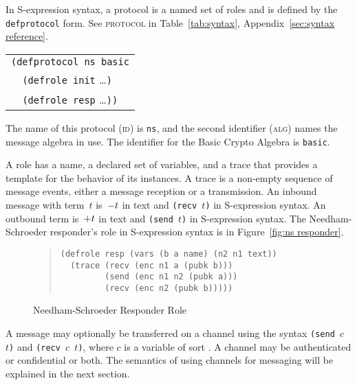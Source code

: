 \documentclass[12pt]{article}
\begin{document}
In S-expression syntax, a protocol is a named set of roles and is
defined by the \texttt{defprotocol} form.  See \textsc{protocol} in
Table~\ref{tab:syntax}, Appendix~\ref{sec:syntax reference}.
\begin{center}
\begin{tabular}{l}
\verb|(defprotocol ns basic|\\
\verb|  (defrole init| \ldots\texttt{)}\\
\verb|  (defrole resp| \ldots\texttt{))}
\end{tabular}
\end{center}

The name of this protocol (\textsc{id}) is \texttt{ns}, and the second
identifier (\textsc{alg}) names the message algebra in use.  The
identifier for the Basic Crypto Algebra is \texttt{basic}.

A role has a name, a declared set of variables, and a trace that
provides a template for the behavior of its instances.  A trace is a
non-empty sequence of message events, either a message reception or a
transmission.  An inbound message with term~$t$
is~$\mathord - t$ in text and \texttt{(recv $t$)} in S-expression syntax.
An outbound term is~$\mathord + t$ in text and
\texttt{(send $t$)} in S-expression syntax.  The Needham-Schroeder
responder's role in S-expression syntax is in Figure~\ref{fig:ns
  responder}.


\begin{figure}
\begin{quote}
\begin{verbatim}
(defrole resp (vars (b a name) (n2 n1 text))
  (trace (recv (enc n1 a (pubk b)))
         (send (enc n1 n2 (pubk a)))
         (recv (enc n2 (pubk b)))))
\end{verbatim}
\end{quote}
\caption{Needham-Schroeder Responder Role}
\label{fig:ns responder}
\end{figure}

A message may optionally be transferred on a channel using the syntax
\texttt{(send $c$ $t$)} and \texttt{(recv $c$ $t$)}, where $c$ is a
variable of sort .  A channel may be authenticated or confidential or
both.  The semantics of using channels for messaging will be explained
in the next section.
\end{document}
